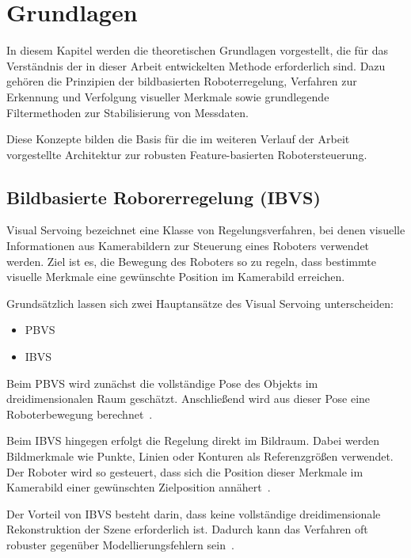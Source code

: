 \chapter{Grundlagen}
\label{ch:grundlagen}
In diesem Kapitel werden die theoretischen Grundlagen vorgestellt, die für das Verständnis der in dieser Arbeit entwickelten Methode erforderlich sind. Dazu gehören die Prinzipien der bildbasierten Roboterregelung, Verfahren zur Erkennung und Verfolgung visueller Merkmale sowie grundlegende Filtermethoden zur Stabilisierung von Messdaten.

Diese Konzepte bilden die Basis für die im weiteren Verlauf der Arbeit vorgestellte Architektur zur robusten Feature-basierten Robotersteuerung.

\section{Bildbasierte Roborerregelung (IBVS)}
\label{sec:BildbasierteRoborerregelung}

Visual Servoing bezeichnet eine Klasse von Regelungsverfahren, bei denen visuelle Informationen aus Kamerabildern zur Steuerung eines Roboters verwendet werden. Ziel ist es, die Bewegung des Roboters so zu regeln, dass bestimmte visuelle Merkmale eine gewünschte Position im Kamerabild erreichen. \cite{chaumette2006visual}

Grundsätzlich lassen sich zwei Hauptansätze des Visual Servoing unterscheiden:
\begin{itemize}
	\item \acl{PBVS}
	\item \acl{IBVS}
\end{itemize}
Beim \ac{PBVS} wird zunächst die vollständige Pose des Objekts im dreidimensionalen Raum geschätzt. Anschließend wird aus dieser Pose eine Roboterbewegung berechnet~\cite{chaumette2006visual}.

Beim \ac{IBVS} hingegen erfolgt die Regelung direkt im Bildraum. Dabei werden Bildmerkmale wie Punkte, Linien oder Konturen als Referenzgrößen verwendet. Der Roboter wird so gesteuert, dass sich die Position dieser Merkmale im Kamerabild einer gewünschten Zielposition annähert~\cite{chaumette2006visual, corke2017robotics}.

Der Vorteil von \ac{IBVS} besteht darin, dass keine vollständige dreidimensionale Rekonstruktion der Szene erforderlich ist. Dadurch kann das Verfahren oft robuster gegenüber Modellierungsfehlern sein~\cite{chaumette2006visual}.

